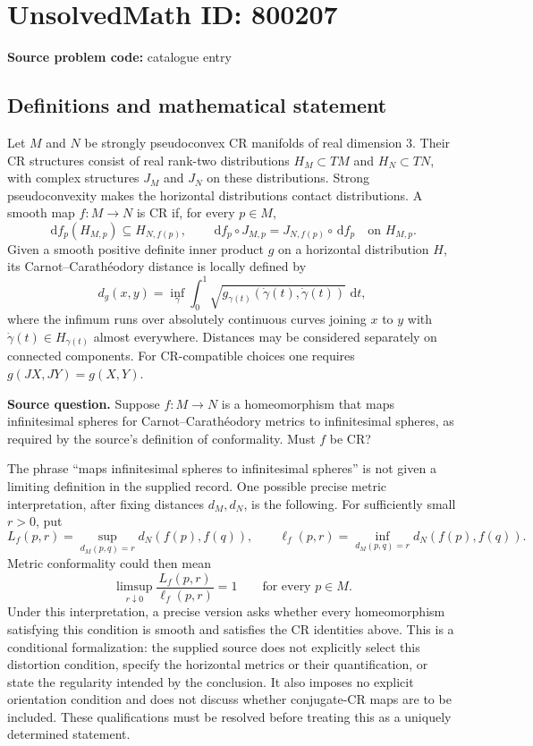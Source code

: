 \documentclass[11pt]{article}
\newcommand{\dd}{\,\mathrm{d}}
\begin{document}
\section*{UnsolvedMath ID: 800207}
\textbf{Source problem code:} catalogue entry
\subsection{Definitions and mathematical statement}
Let \(M\) and \(N\) be strongly pseudoconvex CR manifolds of real dimension \(3\). Their CR structures consist of real rank-two distributions \(H_M\subset TM\) and \(H_N\subset TN\), with complex structures \(J_M\) and \(J_N\) on these distributions. Strong pseudoconvexity makes the horizontal distributions contact distributions. A smooth map \(f:M\to N\) is CR if, for every \(p\in M\),
\[
\dd f_p(H_{M,p})\subseteq H_{N,f(p)},\qquad
\dd f_p\circ J_{M,p}=J_{N,f(p)}\circ\dd f_p\quad\text{on }H_{M,p}.
\]
Given a smooth positive definite inner product \(g\) on a horizontal distribution \(H\), its Carnot--Carath\'eodory distance is locally defined by
\[
d_g(x,y)=\inf_{\gamma}\int_0^1\sqrt{g_{\gamma(t)}(\dot\gamma(t),\dot\gamma(t))}\,\dd t,
\]
where the infimum runs over absolutely continuous curves joining \(x\) to \(y\) with \(\dot\gamma(t)\in H_{\gamma(t)}\) almost everywhere. Distances may be considered separately on connected components. For CR-compatible choices one requires \(g(JX,JY)=g(X,Y)\).

\textbf{Source question.} Suppose \(f:M\to N\) is a homeomorphism that maps infinitesimal spheres for Carnot--Carath\'eodory metrics to infinitesimal spheres, as required by the source's definition of conformality. Must \(f\) be CR?

The phrase ``maps infinitesimal spheres to infinitesimal spheres'' is not given a limiting definition in the supplied record. One possible precise metric interpretation, after fixing distances \(d_M,d_N\), is the following. For sufficiently small \(r>0\), put
\[
L_f(p,r)=\sup_{d_M(p,q)=r}d_N(f(p),f(q)),\qquad
\ell_f(p,r)=\inf_{d_M(p,q)=r}d_N(f(p),f(q)).
\]
Metric conformality could then mean
\[
\limsup_{r\downarrow0}\frac{L_f(p,r)}{\ell_f(p,r)}=1
\qquad\text{for every }p\in M.
\]
Under this interpretation, a precise version asks whether every homeomorphism satisfying this condition is smooth and satisfies the CR identities above. This is a conditional formalization: the supplied source does not explicitly select this distortion condition, specify the horizontal metrics or their quantification, or state the regularity intended by the conclusion. It also imposes no explicit orientation condition and does not discuss whether conjugate-CR maps are to be included. These qualifications must be resolved before treating this as a uniquely determined statement.
\end{document}
